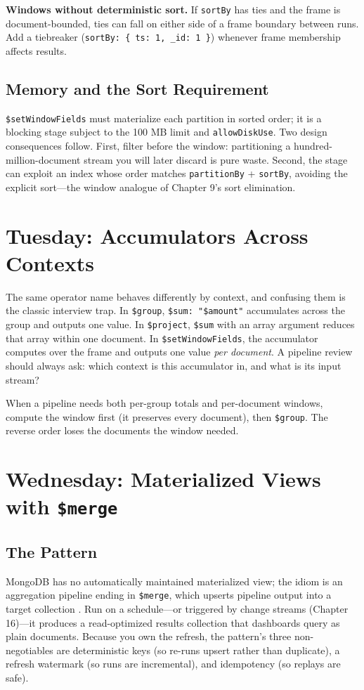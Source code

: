 \begin{pitfall}
\textbf{Windows without deterministic sort.} If \texttt{sortBy} has ties and the frame is document-bounded, ties can fall on either side of a frame boundary between runs. Add a tiebreaker (\texttt{sortBy: \{ ts: 1, \_id: 1 \}}) whenever frame membership affects results.
\end{pitfall}

\subsection{Memory and the Sort Requirement}
\texttt{\$setWindowFields} must materialize each partition in sorted order; it is a blocking stage subject to the 100 MB limit and \texttt{allowDiskUse}. Two design consequences follow. First, filter before the window: partitioning a hundred-million-document stream you will later discard is pure waste. Second, the stage can exploit an index whose order matches \texttt{partitionBy} + \texttt{sortBy}, avoiding the explicit sort---the window analogue of Chapter 9's sort elimination.

\section{Tuesday: Accumulators Across Contexts}
The same operator name behaves differently by context, and confusing them is the classic interview trap. In \texttt{\$group}, \texttt{\$sum: "\$amount"} accumulates across the group and outputs one value. In \texttt{\$project}, \texttt{\$sum} with an array argument reduces that array within one document. In \texttt{\$setWindowFields}, the accumulator computes over the frame and outputs one value \emph{per document}. A pipeline review should always ask: which context is this accumulator in, and what is its input stream?

\begin{tipbox}
When a pipeline needs both per-group totals and per-document windows, compute the window first (it preserves every document), then \texttt{\$group}. The reverse order loses the documents the window needed.
\end{tipbox}

\section{Wednesday: Materialized Views with \texttt{\$merge}}
\subsection{The Pattern}
MongoDB has no automatically maintained materialized view; the idiom is an aggregation pipeline ending in \texttt{\$merge}, which upserts pipeline output into a target collection \cite{mongodbMergeDocs}. Run on a schedule---or triggered by change streams (Chapter 16)---it produces a read-optimized results collection that dashboards query as plain documents. Because you own the refresh, the pattern's three non-negotiables are deterministic keys (so re-runs upsert rather than duplicate), a refresh watermark (so runs are incremental), and idempotency (so replays are safe).

